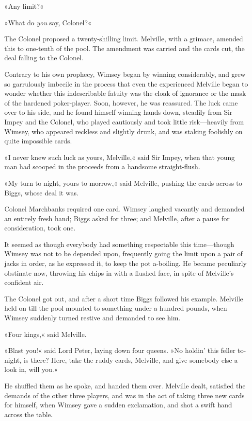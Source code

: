 »Any limit?«

»What do \textit{you} say, Colonel?«

The Colonel proposed a twenty-shilling limit. Melville, with a grimace, amended this to one-tenth of the pool. The amendment was carried and the cards cut, the deal falling to the Colonel.

Contrary to his own prophecy, Wimsey began by winning considerably, and grew so garrulously imbecile in the process that even the experienced Melville began to wonder whether this indescribable fatuity was the cloak of ignorance or the mask of the hardened poker-player. Soon, however, he was reassured. The luck came over to his side, and he found himself winning hands down, steadily from Sir Impey and the Colonel, who played cautiously and took little risk—heavily from Wimsey, who appeared reckless and slightly drunk, and was staking foolishly on quite impossible cards.

»I never knew such luck as yours, Melville,« said Sir Impey, when that young man had scooped in the proceeds from a handsome straight-flush.

»My turn to-night, yours to-morrow,« said Melville, pushing the cards across to Biggs, whose deal it was.

Colonel Marchbanks required one card. Wimsey laughed vacantly and demanded an entirely fresh hand; Biggs asked for three; and Melville, after a pause for consideration, took one.

It seemed as though everybody had something respectable this time—though Wimsey was not to be depended upon, frequently going the limit upon a pair of jacks in order, as he expressed it, to keep the pot a-boiling. He became peculiarly obstinate now, throwing his chips in with a flushed face, in spite of Melville's confident air.

The Colonel got out, and after a short time Biggs followed his example. Melville held on till the pool mounted to something under a hundred pounds, when Wimsey suddenly turned restive and demanded to see him.

»Four kings,« said Melville.

»Blast you!« said Lord Peter, laying down four queens. »No holdin' this feller to-night, is there? Here, take the ruddy cards, Melville, and give somebody else a look in, will you.«

He shuffled them as he spoke, and handed them over. Melville dealt, satisfied the demands of the other three players, and was in the act of taking three new cards for himself, when Wimsey gave a sudden exclamation, and shot a swift hand across the table.

